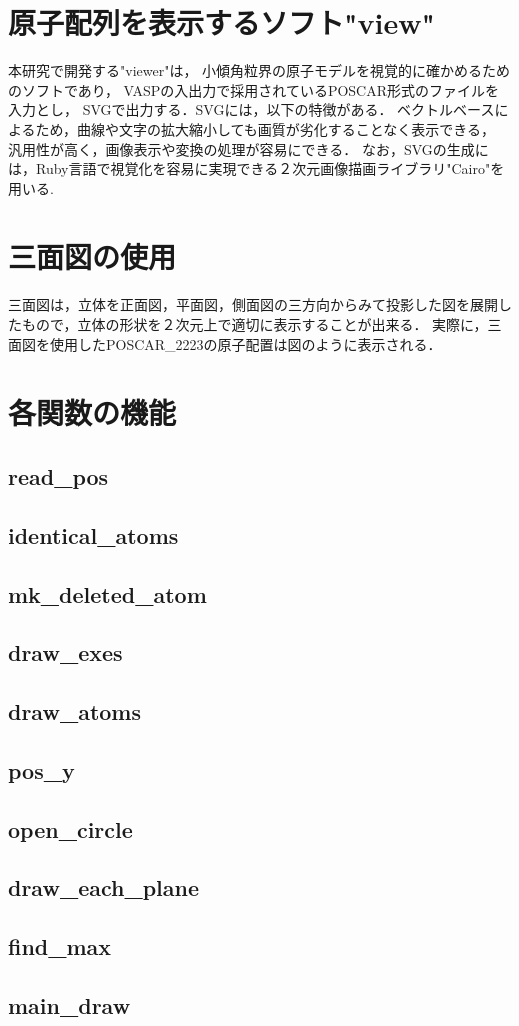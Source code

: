 
\section{原子配列を表示するソフト"view"}
本研究で開発する"viewer"は，
小傾角粒界の原子モデルを視覚的に確かめるためのソフトであり，
VASPの入出力で採用されているPOSCAR形式のファイルを入力とし，
SVGで出力する．SVGには，以下の特徴がある．
ベクトルベースによるため，曲線や文字の拡大縮小しても画質が劣化することなく表示できる，
汎用性が高く，画像表示や変換の処理が容易にできる．
なお，SVGの生成には，Ruby言語で視覚化を容易に実現できる２次元画像描画ライブラリ"Cairo"を用いる.

\section{三面図の使用}
三面図は，立体を正面図，平面図，側面図の三方向からみて投影した図を展開したもので，立体の形状を２次元上で適切に表示することが出来る．
実際に，三面図を使用したPOSCAR\_2223の原子配置は図のように表示される．

\section{各関数の機能}
\subsection{read\_pos}
\subsection{identical\_atoms}
\subsection{mk\_deleted\_atom}
\subsection{draw\_exes}
\subsection{draw\_atoms}
\subsection{pos\_y}
\subsection{open\_circle}
\subsection{draw\_each\_plane}
\subsection{find\_max}
\subsection{main\_draw}
